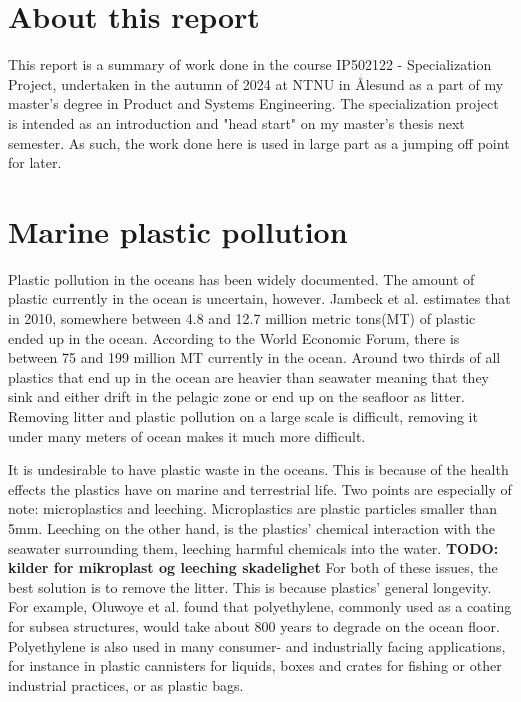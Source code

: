 

\section{About this report}
This report is a summary of work done in the course IP502122 - Specialization Project, undertaken in the autumn of 2024 at NTNU in Ålesund as a part of my master's degree in Product and Systems Engineering. The specialization project is intended as an introduction and "head start" on my master's thesis next semester. As such, the work done here is used in large part as a jumping off point for later.

\section{Marine plastic pollution}
Plastic pollution in the oceans has been widely documented. The amount of plastic currently in the ocean is uncertain, however. Jambeck et al.\cite{jambeck_plastic_2015} estimates that in 2010, somewhere between 4.8 and 12.7 million metric tons(MT) of plastic ended up in the ocean. According to the World Economic Forum\cite{wef}, there is between 75 and 199 million MT currently in the ocean. Around two thirds of all plastics that end up in the ocean are heavier than seawater \cite{isobe_fate_2022} meaning that they sink and either drift in the pelagic zone or end up on the seafloor as litter. Removing litter and plastic pollution on a large scale is difficult, removing it under many meters of ocean makes it much more difficult. 

It is undesirable to have plastic waste in the oceans. This is because of the health effects the plastics have on marine and terrestrial life. Two points are especially of note: microplastics and leeching. Microplastics are plastic particles smaller than 5mm. Leeching on the other hand, is the plastics' chemical interaction with the seawater surrounding them, leeching harmful chemicals into the water. \textbf{TODO: kilder for mikroplast og leeching skadelighet} For both of these issues, the best solution is to remove the litter. This is because plastics' general longevity. For example, Oluwoye et al. \cite{oluwoye_degradation_2023} found that polyethylene, commonly used as a coating for subsea structures, would take about 800 years to degrade on the ocean floor. Polyethylene is also used in many consumer- and industrially facing applications, for instance in plastic cannisters for liquids, boxes and crates for fishing or other industrial practices, or as plastic bags. 

